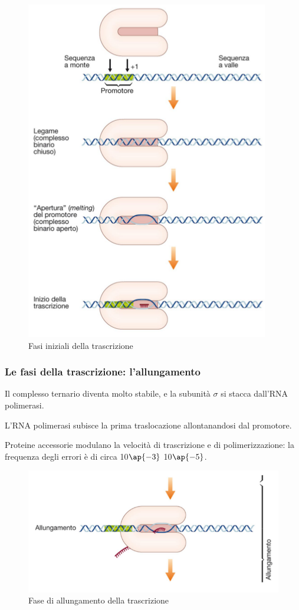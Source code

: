 \documentclass[11pt]{book}
\begin{document}
\clearpage
\begin{figure}[htp]
\centering
\includegraphics[scale=0.5]{img/Inizio trascrizione.png}
\caption{Fasi iniziali della trascrizione}
\label{}
\end{figure}

\subsubsection{Le fasi della trascrizione: l’allungamento}
Il complesso ternario diventa molto stabile, e la subunità $\sigma$ si stacca dall’RNA polimerasi.

L’RNA polimerasi subisce la prima traslocazione allontanandosi dal promotore.

Proteine accessorie modulano la velocità di trascrizione e di polimerizzazione: la frequenza degli errori è di circa 10$\ap{-3}$ 10$\ap{-5}$. 

\begin{figure}[htp]
\centering
\includegraphics[scale=0.4]{img/Allungamento trascrizione.png}
\caption{Fase di allungamento della trascrizione}
\label{}
\end{figure}
\end{document}
